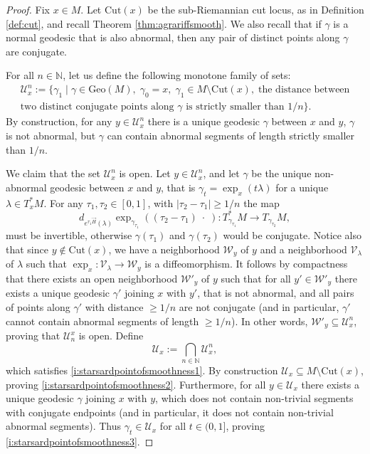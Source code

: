 \documentclass[11pt,a4paper]{article}
\theoremstyle{plain}
\theoremstyle{definition}
\theoremstyle{remark}
\numberwithin{equation}{section}
\newcommand{\N}{\mathbb{N}} %
\newcommand{\Cut}{\mathrm{Cut}}
\newcommand{\Geo}{\mathrm{Geo}}
\begin{document}
\begin{proof} 
Fix $x\in M$. Let $\mathrm{Cut}(x)$ be the sub-Riemannian cut locus, as in Definition \ref{def:cut}, and recall Theorem \ref{thm:agrariffsmooth}. We also recall that if $\gamma$ is a normal geodesic that is also abnormal, then any pair of distinct points along $\gamma$ are conjugate.

For all $n\in \N$, let us define the following monotone family of sets:
\begin{multline}
\mathcal{U}^n_x:=\{\gamma_1\mid \gamma\in \Geo(M),\; \gamma_0 = x, \; \gamma_1 \in M\setminus \Cut(x), \; \text{the distance between} \\ \text{two distinct conjugate points along $\gamma$ is strictly smaller than $1/n$}\}.
\end{multline}
By construction, for any $y\in  \mathcal{U}^{n}_x$ there is a unique geodesic $\gamma$ between $x$ and $y$, $\gamma$ is not abnormal, but $\gamma$ can contain abnormal segments of length strictly smaller than $1/n$.

We claim that the set $\mathcal{U}^n_x$ is open. Let $y\in \mathcal{U}_x^n$, and let $\gamma$ be the unique non-abnormal geodesic between $x$ and $y$, that is $\gamma_t = \exp_x(t\lambda)$ for a unique $\lambda \in T_x^*M$. For any $\tau_1,\tau_2\in [0,1]$, with $|\tau_2-\tau_1|\geq 1/n$ the map 
\begin{equation}
d_{e^{\tau_1\vec{H}}(\lambda)} \exp_{\gamma_{\tau_1}}((\tau_2-\tau_1)\;\cdot\;): T_{\gamma_{\tau_1}}^*M \to T_{\gamma_{\tau_2}}M,
\end{equation}
must be invertible, otherwise $\gamma(\tau_1)$ and $\gamma(\tau_2)$ would be conjugate. Notice also that since $y\notin \Cut(x)$, we have a neighborhood $\mathcal{W}_y$ of $y$ and a neighborhood $\mathcal{V}_\lambda$ of $\lambda$ such that $\exp_x:\mathcal{V}_\lambda \to \mathcal{W}_y$ is a diffeomorphism. It follows by compactness that there exists an open neighborhood $\mathcal{W}'_y$ of $y$ such that for all $y'\in \mathcal{W}'_y$ there exists a unique geodesic $\gamma'$ joining $x$ with $y'$, that is not abnormal, and all pairs of points along $\gamma'$ with distance $\geq 1/n$ are not conjugate (and in particular, $\gamma'$ cannot contain abnormal segments of length $\geq 1/n$). In other words, $\mathcal{W}'_y\subseteq \mathcal{U}^n_x$, proving that $\mathcal{U}_n^x$ is open. Define
\begin{equation}
\mathcal{U}_x:=\bigcap_{n\in \N} \mathcal{U}_x^n,
\end{equation}
which satisfies \ref{i:starsardpointofsmoothness1}. By construction $\mathcal{U}_x\subseteq M\setminus \Cut(x)$, proving \ref{i:starsardpointofsmoothness2}. Furthermore, for all $y \in \mathcal{U}_x$ there exists a unique geodesic $\gamma$ joining $x$ with $y$, which does not contain non-trivial segments with conjugate endpoints (and in particular, it does not contain non-trivial abnormal segments). Thus $\gamma_t \in \mathcal{U}_x$ for all $t\in (0,1]$, proving \ref{i:starsardpointofsmoothness3}.


\end{proof}
\end{document}
